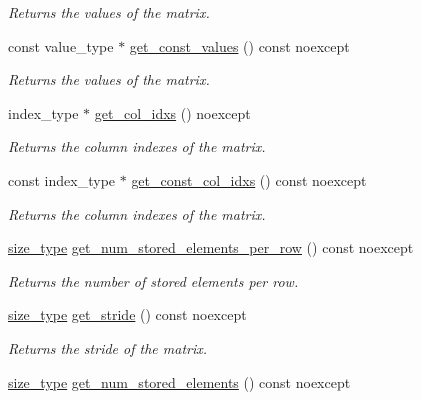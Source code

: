 \begin{DoxyCompactItemize}
\begin{DoxyCompactList}\small\item\em Returns the values of the matrix. \end{DoxyCompactList}\item 
const value\+\_\+type $\ast$ \hyperlink{classgko_1_1matrix_1_1Ell_a5bc4d3c67b328b353409e76eb9f70803}{get\+\_\+const\+\_\+values} () const noexcept
\begin{DoxyCompactList}\small\item\em Returns the values of the matrix. \end{DoxyCompactList}\item 
index\+\_\+type $\ast$ \hyperlink{classgko_1_1matrix_1_1Ell_ac80ca9482997e97d88425214fd1b8aef}{get\+\_\+col\+\_\+idxs} () noexcept
\begin{DoxyCompactList}\small\item\em Returns the column indexes of the matrix. \end{DoxyCompactList}\item 
const index\+\_\+type $\ast$ \hyperlink{classgko_1_1matrix_1_1Ell_addb3c84f52b090c75f519833fb379cef}{get\+\_\+const\+\_\+col\+\_\+idxs} () const noexcept
\begin{DoxyCompactList}\small\item\em Returns the column indexes of the matrix. \end{DoxyCompactList}\item 
\hyperlink{namespacegko_a6e5c95df0ae4e47aab2f604a22d98ee7}{size\+\_\+type} \hyperlink{classgko_1_1matrix_1_1Ell_a08f9b04b356e58ab57d03ce335ff11ce}{get\+\_\+num\+\_\+stored\+\_\+elements\+\_\+per\+\_\+row} () const noexcept
\begin{DoxyCompactList}\small\item\em Returns the number of stored elements per row. \end{DoxyCompactList}\item 
\hyperlink{namespacegko_a6e5c95df0ae4e47aab2f604a22d98ee7}{size\+\_\+type} \hyperlink{classgko_1_1matrix_1_1Ell_a0be6e75dcea0975b10e3389a9eedacc1}{get\+\_\+stride} () const noexcept
\begin{DoxyCompactList}\small\item\em Returns the stride of the matrix. \end{DoxyCompactList}\item 
\hyperlink{namespacegko_a6e5c95df0ae4e47aab2f604a22d98ee7}{size\+\_\+type} \hyperlink{classgko_1_1matrix_1_1Ell_aecca4e9cfb1e81958881c6dc3e2aa06f}{get\+\_\+num\+\_\+stored\+\_\+elements} () const noexcept

\end{DoxyCompactItemize}
